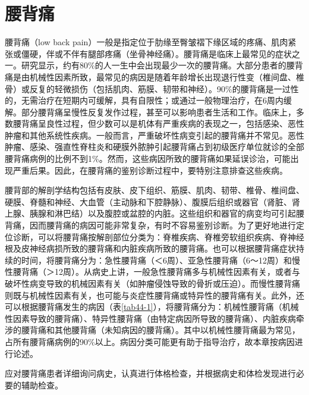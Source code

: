 \chapter{腰背痛}

腰背痛（low back
pain）一般是指定位于肋缘至臀皱褶下缘区域的疼痛、肌肉紧张或僵硬，伴或不伴有腿部疼痛（坐骨神经痛）。腰背痛是临床上最常见的症状之一。研究显示，约有80\%的人一生中会出现最少一次的腰背痛。大部分患者的腰背痛是由机械性因素所致，最常见的病因是随着年龄增长出现退行性变（椎间盘、椎骨）或反复的轻微损伤（包括肌肉、筋膜、韧带和神经）。90\%的腰背痛是一过性的，无需治疗在短期内可缓解，具有自限性；或通过一般物理治疗，在6周内缓解。部分腰背痛呈慢性反复发作过程，甚至可以影响患者生活和工作。临床上，多数腰背痛呈良性过程，但少数可以是机体有严重疾病的表现之一，包括感染、恶性肿瘤和其他系统性疾病。一般而言，严重破坏性病变引起的腰背痛并不常见。恶性肿瘤、感染、强直性脊柱炎和硬膜外脓肿引起腰背痛占到初级医疗单位就诊的全部腰背痛病例的比例不到1\%。然而，这些病因所致的腰背痛如果延误诊治，可能出现严重后果。因此，在腰背痛的鉴别诊断过程中，要特别注意排查这些疾病。

腰背部的解剖学结构包括有皮肤、皮下组织、筋膜、肌肉、韧带、椎骨、椎间盘、硬膜、脊髓和神经、大血管（主动脉和下腔静脉）、腹膜后组织或器官（肾脏、肾上腺、胰腺和淋巴结）以及腹腔或盆腔的内脏。这些组织和器官的病变均可引起腰背痛，因而腰背痛的病因可能非常复杂，有时不容易鉴别诊断。为了更好地进行定位诊断，可以将腰背痛按解剖部位分类为：脊椎疾病、脊椎旁软组织疾病、脊神经根及皮神经病损所致的腰背痛和内脏疾病所致的腰背痛。也可以根据腰背痛症状持续的时间，将腰背痛分为：急性腰背痛（＜6周）、亚急性腰背痛（6～12周）和慢性腰背痛（＞12周）。从病史上讲，一般急性腰背痛多与机械性因素有关，或者与破坏性病变导致的机械因素有关（如肿瘤侵蚀导致的骨折或压迫）。而慢性腰背痛则既与机械性因素有关，也可能与炎症性腰背痛或特异性的腰背痛有关。此外，还可以根据腰背痛发生的病因（表\ref{tab44-1}），将腰背痛分为：机械性腰背痛（机械性因素导致的腰背痛）、特异性腰背痛（由特定病因所导致的腰背痛）、内脏疾病牵涉的腰背痛和其他腰背痛（未知病因的腰背痛）。其中以机械性腰背痛最为常见，占所有腰背痛病例的90\%以上。病因分类可能更有助于指导治疗，故本章按病因进行论述。

应对腰背痛患者详细询问病史，认真进行体格检查，并根据病史和体检发现进行必要的辅助检查。

